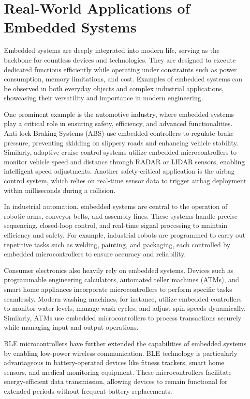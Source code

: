 \documentclass[
  9pt,
  letterpaper,
  abstract,
  titlepage]{scrbook}
\begin{document}
\section{Real-World Applications of Embedded
Systems}\label{real-world-applications-of-embedded-systems}

Embedded systems are deeply integrated into modern life, serving as the
backbone for countless devices and technologies. They are designed to
execute dedicated functions efficiently while operating under
constraints such as power consumption, memory limitations, and cost.
Examples of embedded systems can be observed in both everyday objects
and complex industrial applications, showcasing their versatility and
importance in modern engineering.

One prominent example is the automotive industry, where embedded systems
play a critical role in ensuring safety, efficiency, and advanced
functionalities. Anti-lock Braking Systems (ABS) use embedded
controllers to regulate brake pressure, preventing skidding on slippery
roads and enhancing vehicle stability. Similarly, adaptive cruise
control systems utilize embedded microcontrollers to monitor vehicle
speed and distance through RADAR or LIDAR sensors, enabling intelligent
speed adjustments. Another safety-critical application is the airbag
control system, which relies on real-time sensor data to trigger airbag
deployment within milliseconds during a collision.

In industrial automation, embedded systems are central to the operation
of robotic arms, conveyor belts, and assembly lines. These systems
handle precise sequencing, closed-loop control, and real-time signal
processing to maintain efficiency and safety. For example, industrial
robots are programmed to carry out repetitive tasks such as welding,
painting, and packaging, each controlled by embedded microcontrollers to
ensure accuracy and reliability.

Consumer electronics also heavily rely on embedded systems. Devices such
as programmable engineering calculators, automated teller machines
(ATMs), and smart home appliances incorporate microcontrollers to
perform specific tasks seamlessly. Modern washing machines, for
instance, utilize embedded controllers to monitor water levels, manage
wash cycles, and adjust spin speeds dynamically. Similarly, ATMs use
embedded microcontrollers to process transactions securely while
managing input and output operations.

BLE microcontrollers have further extended the capabilities of embedded
systems by enabling low-power wireless communication. BLE technology is
particularly advantageous in battery-operated devices like fitness
trackers, smart home sensors, and medical monitoring equipment. These
microcontrollers facilitate energy-efficient data transmission, allowing
devices to remain functional for extended periods without frequent
battery replacements.
\end{document}
